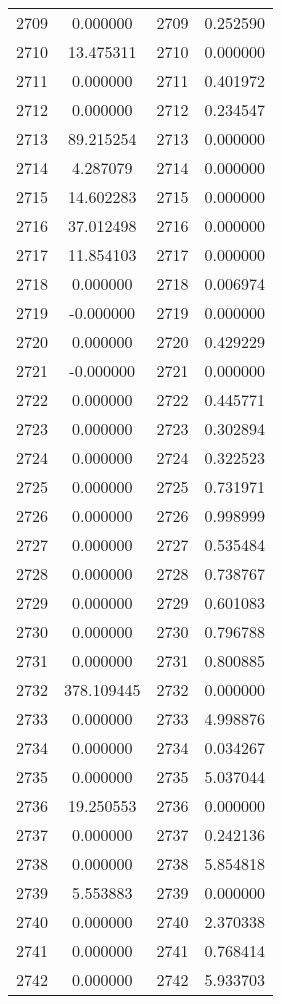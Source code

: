 \documentclass[12pt]{article}
\begin{document}
\begin{longtable}{@{}cccc@{}}
2709 & 0.000000 & 2709 & 0.252590 \\
2710 & 13.475311 & 2710 & 0.000000 \\
2711 & 0.000000 & 2711 & 0.401972 \\
2712 & 0.000000 & 2712 & 0.234547 \\
2713 & 89.215254 & 2713 & 0.000000 \\
2714 & 4.287079 & 2714 & 0.000000 \\
2715 & 14.602283 & 2715 & 0.000000 \\
2716 & 37.012498 & 2716 & 0.000000 \\
2717 & 11.854103 & 2717 & 0.000000 \\
2718 & 0.000000 & 2718 & 0.006974 \\
2719 & -0.000000 & 2719 & 0.000000 \\
2720 & 0.000000 & 2720 & 0.429229 \\
2721 & -0.000000 & 2721 & 0.000000 \\
2722 & 0.000000 & 2722 & 0.445771 \\
2723 & 0.000000 & 2723 & 0.302894 \\
2724 & 0.000000 & 2724 & 0.322523 \\
2725 & 0.000000 & 2725 & 0.731971 \\
2726 & 0.000000 & 2726 & 0.998999 \\
2727 & 0.000000 & 2727 & 0.535484 \\
2728 & 0.000000 & 2728 & 0.738767 \\
2729 & 0.000000 & 2729 & 0.601083 \\
2730 & 0.000000 & 2730 & 0.796788 \\
2731 & 0.000000 & 2731 & 0.800885 \\
2732 & 378.109445 & 2732 & 0.000000 \\
2733 & 0.000000 & 2733 & 4.998876 \\
2734 & 0.000000 & 2734 & 0.034267 \\
2735 & 0.000000 & 2735 & 5.037044 \\
2736 & 19.250553 & 2736 & 0.000000 \\
2737 & 0.000000 & 2737 & 0.242136 \\
2738 & 0.000000 & 2738 & 5.854818 \\
2739 & 5.553883 & 2739 & 0.000000 \\
2740 & 0.000000 & 2740 & 2.370338 \\
2741 & 0.000000 & 2741 & 0.768414 \\
2742 & 0.000000 & 2742 & 5.933703 \\

\end{longtable}
\end{document}
